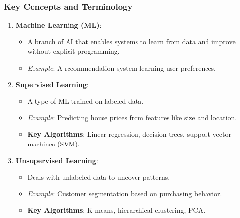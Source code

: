 \documentclass[aspectratio=169]{beamer}
\begin{document}
\begin{frame}[fragile]
    \frametitle{Key Concepts and Terminology}
    
    \begin{enumerate}
        \item \textbf{Machine Learning (ML)}:
        \begin{itemize}
            \item A branch of AI that enables systems to learn from data and improve without explicit programming.
            \item \textit{Example}: A recommendation system learning user preferences.
        \end{itemize}
        
        \item \textbf{Supervised Learning}:
        \begin{itemize}
            \item A type of ML trained on labeled data.
            \item \textit{Example}: Predicting house prices from features like size and location.
            \item \textbf{Key Algorithms}: Linear regression, decision trees, support vector machines (SVM).
        \end{itemize}
        
        \item \textbf{Unsupervised Learning}:
        \begin{itemize}
            \item Deals with unlabeled data to uncover patterns.
            \item \textit{Example}: Customer segmentation based on purchasing behavior.
            \item \textbf{Key Algorithms}: K-means, hierarchical clustering, PCA.
        \end{itemize}
    \end{enumerate}
\end{frame}
\end{document}
